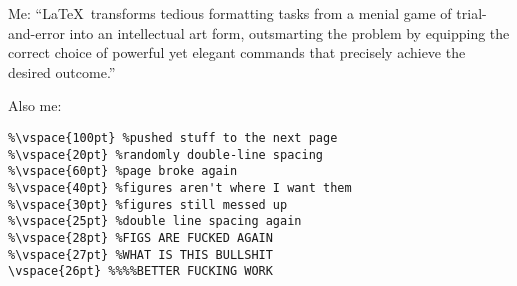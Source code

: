 \documentclass[12pt,varwidth=9cm,preview,border=0.3cm,convert]{standalone}
\begin{document}
    Me: ``\LaTeX\ transforms tedious formatting tasks
    from a menial game of trial-and-error into an intellectual art form,
    outsmarting the problem by equipping the correct choice
    of powerful yet elegant commands that precisely achieve
    the desired outcome.''

    Also me:

    \begin{lstlisting}
%\vspace{100pt} %pushed stuff to the next page
%\vspace{20pt} %randomly double-line spacing
%\vspace{60pt} %page broke again
%\vspace{40pt} %figures aren't where I want them
%\vspace{30pt} %figures still messed up
%\vspace{25pt} %double line spacing again
%\vspace{28pt} %FIGS ARE FUCKED AGAIN
%\vspace{27pt} %WHAT IS THIS BULLSHIT
\vspace{26pt} %%%%BETTER FUCKING WORK
    \end{lstlisting}
\end{document}
